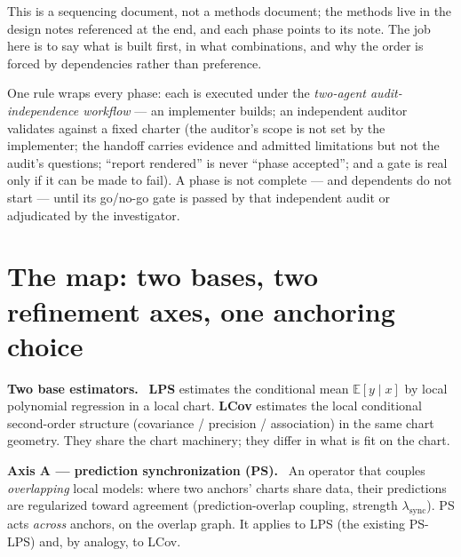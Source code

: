 \documentclass[11pt]{article}
\newcommand{\field}[1]{\smallskip\noindent\textbf{\textsf{#1.}}\ }
\begin{document}
This is a sequencing document, not a methods document; the methods live in the
design notes referenced at the end, and each phase points to its note. The job here
is to say what is built first, in what combinations, and why the order is forced by
dependencies rather than preference.

One rule wraps every phase: each is executed under the \emph{two-agent
audit-independence workflow} --- an implementer builds; an independent auditor
validates against a fixed charter (the auditor's scope is not set by the
implementer; the handoff carries evidence and admitted limitations but not the
audit's questions; ``report rendered'' is never ``phase accepted''; and a gate is
real only if it can be made to fail). A phase is not complete --- and dependents do
not start --- until its go/no-go gate is passed by that independent audit or
adjudicated by the investigator.

\section{The map: two bases, two refinement axes, one anchoring choice}\label{sec:map}

\field{Two base estimators} \textbf{LPS} estimates the conditional mean
$\mathbb{E}[y\mid x]$ by local polynomial regression in a local chart. \textbf{LCov}
estimates the local conditional second-order structure (covariance / precision /
association) in the same chart geometry. They share the chart machinery; they differ
in what is fit on the chart.

\field{Axis A --- prediction synchronization (PS)} An operator that couples
\emph{overlapping} local models: where two anchors' charts share data, their
predictions are regularized toward agreement (prediction-overlap coupling, strength
$\lambda_{\mathrm{sync}}$). PS acts \emph{across} anchors, on the overlap graph. It
applies to LPS (the existing PS-LPS) and, by analogy, to LCov.
\end{document}
